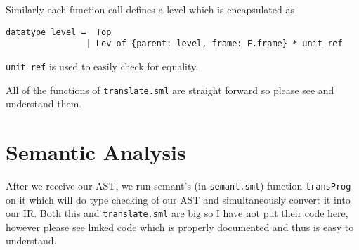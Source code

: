 Similarly each function call defines a level which is encapsulated as 
\begin{verbatim}
datatype level =  Top
                | Lev of {parent: level, frame: F.frame} * unit ref
\end{verbatim} 

\texttt{unit ref} is used to easily check for equality.

All of the functions of \texttt{translate.sml} are straight forward so please see and understand them.

\section{Semantic Analysis}


After we receive our AST, we run semant's (in \texttt{semant.sml}) function \texttt{transProg} on it which will do type checking of our AST and simultaneously convert it into our IR. Both this and \texttt{translate.sml} are big so I have not put their code here, however please see linked code which is properly documented and thus is easy to understand.